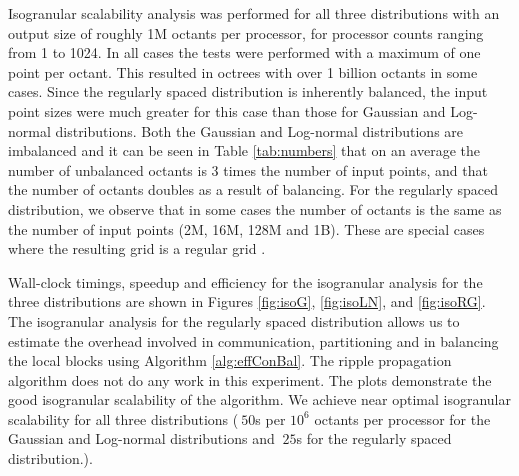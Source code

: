 Isogranular scalability analysis was performed for all three
distributions with an output size of roughly 1M octants per processor,
for processor counts ranging from 1 to 1024. In all cases the tests
were performed with a maximum of one point per octant. This resulted
in octrees with over 1 billion octants in some cases. Since the
regularly spaced distribution is inherently balanced, the input point
sizes were much greater for this case than those for Gaussian and
Log-normal distributions. Both the Gaussian and Log-normal
distributions are imbalanced and it can be seen in Table
\ref{tab:numbers} that on an average the number of unbalanced octants
is 3 times the number of input points, and that the number of octants
doubles as a result of balancing. For the regularly spaced
distribution, we observe that in some cases the number of octants is
the same as the number of input points (2M, 16M, 128M and 1B). These
are special cases where the resulting grid is a regular grid .

Wall-clock timings, speedup and efficiency for the isogranular
analysis for the three distributions are shown in Figures
\ref{fig:isoG}, \ref{fig:isoLN}, and \ref{fig:isoRG}. The isogranular
analysis for the regularly spaced distribution allows us to estimate
the overhead involved in communication, partitioning and in balancing
the local blocks using Algorithm \ref{alg:effConBal}. The ripple
propagation algorithm does not do any work in this experiment. The
plots demonstrate the good isogranular scalability of the
algorithm. We achieve near optimal isogranular scalability for all
three distributions ($~50$s per $10^6$ octants per processor for the
Gaussian and Log-normal distributions and $~25$s for the regularly
spaced distribution.).

